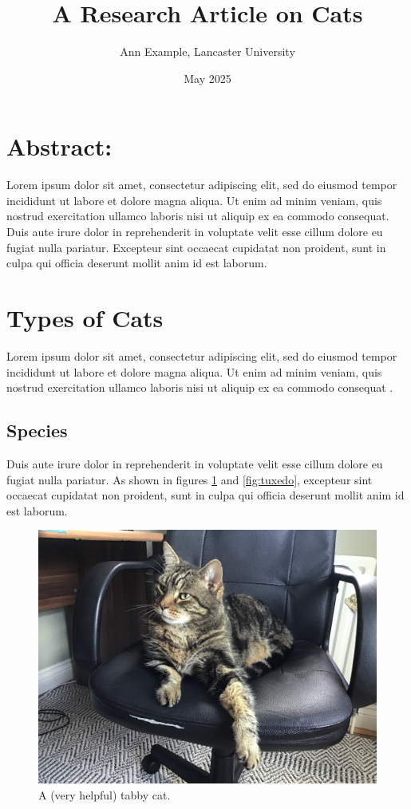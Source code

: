 \documentclass{article}
\title{A Research Article on Cats}
\author{Ann Example, Lancaster University}
\date{May 2025}
\begin{document}
\maketitle

\section{Abstract:}

Lorem ipsum dolor sit amet, consectetur adipiscing elit, sed do eiusmod tempor incididunt ut labore et dolore magna aliqua. Ut enim ad minim veniam, quis nostrud exercitation ullamco laboris nisi ut aliquip ex ea commodo consequat. Duis aute irure dolor in reprehenderit in voluptate velit esse cillum dolore eu fugiat nulla pariatur. Excepteur sint occaecat cupidatat non proident, sunt in culpa qui officia deserunt mollit anim id est laborum.

\tableofcontents

\section{Types of Cats}

Lorem ipsum dolor sit amet, consectetur adipiscing elit, sed do eiusmod tempor incididunt ut labore et dolore magna aliqua. Ut enim ad minim veniam, quis nostrud exercitation ullamco laboris nisi ut aliquip ex ea commodo consequat \autocite[16]{fardin_rheology_2014}. 

\subsection{Species}

Duis aute irure dolor in reprehenderit in voluptate velit esse cillum dolore eu fugiat nulla pariatur. As shown in figures \ref{fig:tabby} and \ref{fig:tuxedo}, excepteur sint occaecat cupidatat non proident, sunt in culpa qui officia deserunt mollit anim id est laborum.

\begin{figure}[H]
    \centering
    \includegraphics[width=0.5\linewidth]{tabby.jpeg}
    \caption{A (very helpful) tabby cat.}
    \label{fig:tabby}
\end{figure}
\end{document}
